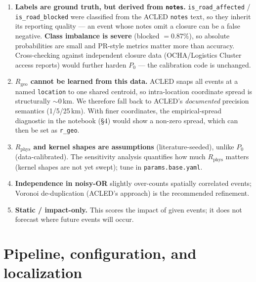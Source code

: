 \documentclass[11pt,a4paper]{article}
\newcommand{\code}[1]{\texttt{\small #1}}
\newcommand{\Rphys}{R_{\mathrm{phys}}}
\newcommand{\Rgeo}{R_{\mathrm{geo}}}
\begin{document}
\begin{enumerate}[leftmargin=1.6em]
  \item \textbf{Labels are ground truth, but derived from \code{notes}.} \code{is\_road\_affected}
        / \code{is\_road\_blocked} were classified from the ACLED \code{notes} text, so they
        inherit its reporting quality --- an event whose notes omit a closure can be a false
        negative. \textbf{Class imbalance is severe} (blocked $=0.87\%$), so absolute
        probabilities are small and PR-style metrics matter more than accuracy. Cross-checking
        against independent closure data (OCHA/Logistics Cluster access reports) would further
        harden $P_0$ --- the calibration code is unchanged.
  \item \textbf{$\Rgeo$ cannot be learned from this data.} ACLED snaps all events at a named
        \code{location} to one shared centroid, so intra-location coordinate spread is
        structurally $\sim$0\,km. We therefore fall back to ACLED's \emph{documented} precision
        semantics (1/5/25\,km). With finer coordinates, the empirical-spread diagnostic in the
        notebook (\S4) would show a non-zero spread, which can then be set as \code{r\_geo}.
  \item \textbf{$\Rphys$ and kernel shapes are assumptions} (literature-seeded), unlike $P_0$
        (data-calibrated). The sensitivity analysis quantifies how much $\Rphys$ matters (kernel
        shapes are not yet swept); tune in \code{params.base.yaml}.
  \item \textbf{Independence in noisy-OR} slightly over-counts spatially correlated events;
        Voronoi de-duplication (ACLED's approach) is the recommended refinement.
  \item \textbf{Static / impact-only.} This scores the impact of given events; it does not
        forecast where future events will occur.
\end{enumerate}

\section{Pipeline, configuration, and localization}
\end{document}
